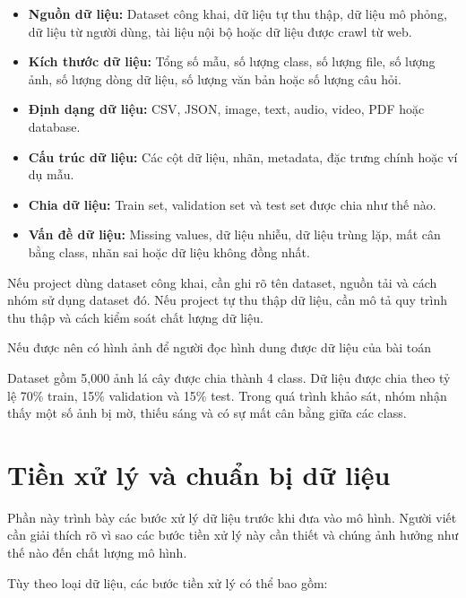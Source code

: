 \documentclass[12pt]{ai_conquer2026}
\begin{document}
\begin{itemize}
\item \textbf{Nguồn dữ liệu:} Dataset công khai, dữ liệu tự thu thập, dữ liệu mô phỏng, dữ liệu từ người dùng, tài liệu nội bộ hoặc dữ liệu được crawl từ web.
\item \textbf{Kích thước dữ liệu:} Tổng số mẫu, số lượng class, số lượng file, số lượng ảnh, số lượng dòng dữ liệu, số lượng văn bản hoặc số lượng câu hỏi.
\item \textbf{Định dạng dữ liệu:} CSV, JSON, image, text, audio, video, PDF hoặc database.
\item \textbf{Cấu trúc dữ liệu:} Các cột dữ liệu, nhãn, metadata, đặc trưng chính hoặc ví dụ mẫu.
\item \textbf{Chia dữ liệu:} Train set, validation set và test set được chia như thế nào.
\item \textbf{Vấn đề dữ liệu:} Missing values, dữ liệu nhiễu, dữ liệu trùng lặp, mất cân bằng class, nhãn sai hoặc dữ liệu không đồng nhất.
\end{itemize}

Nếu project dùng dataset công khai, cần ghi rõ tên dataset, nguồn tải và cách nhóm sử dụng dataset đó. Nếu project tự thu thập dữ liệu, cần mô tả quy trình thu thập và cách kiểm soát chất lượng dữ liệu.

Nếu được nên có hình ảnh để người đọc hình dung được dữ liệu của bài toán

\begin{aivncodebox}[Ví dụ:]
Dataset gồm 5,000 ảnh lá cây được chia thành 4 class. Dữ liệu được chia theo tỷ lệ 70\% train, 15\% validation và 15\% test. Trong quá trình khảo sát, nhóm nhận thấy một số ảnh bị mờ, thiếu sáng và có sự mất cân bằng giữa các class.
\end{aivncodebox}

\section{Tiền xử lý và chuẩn bị dữ liệu}

Phần này trình bày các bước xử lý dữ liệu trước khi đưa vào mô hình. Người viết cần giải thích rõ vì sao các bước tiền xử lý này cần thiết và chúng ảnh hưởng như thế nào đến chất lượng mô hình.

Tùy theo loại dữ liệu, các bước tiền xử lý có thể bao gồm:
\end{document}

